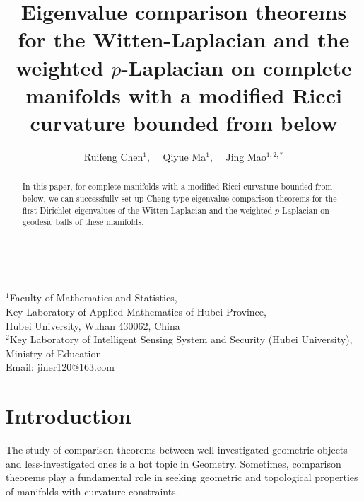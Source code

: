\documentclass[12pt]{article}
\begin{document}
\setcounter{page}{1}
\title{Eigenvalue comparison theorems for the Witten-Laplacian and the weighted $p$-Laplacian on complete manifolds with a modified Ricci
curvature bounded from below}
\author{Ruifeng Chen$^{1}$,~~ Qiyue Ma$^{1}$, ~~Jing Mao$^{1,2,\ast}$}

\date{}
\protect {}
\maketitle ~~~\\[-15mm]



\begin{center}
{\footnotesize $^{1}$Faculty of Mathematics and Statistics,\\
 Key Laboratory of Applied
Mathematics of Hubei Province, \\
Hubei University, Wuhan 430062, China\\
$^{2}$Key Laboratory of Intelligent Sensing System and Security
(Hubei
University), Ministry of Education\\
Email: jiner120@163.com
 }
\end{center}


\begin{abstract}
In this paper, for complete manifolds with a modified Ricci
curvature bounded from below, we can successfully set up Cheng-type
eigenvalue comparison theorems for the first Dirichlet eigenvalues
of the Witten-Laplacian and the weighted $p$-Laplacian on geodesic
balls of these manifolds.
 \end{abstract}




\section{Introduction}
\renewcommand{\thesection}{\arabic{section}}
\renewcommand{\theequation}{\thesection.\arabic{equation}}
\setcounter{equation}{0}

The study of comparison theorems between well-investigated geometric
objects and less-investigated ones is a hot topic in Geometry.
Sometimes, comparison theorems play a fundamental role in seeking
geometric and topological properties of manifolds with curvature
constraints.
\end{document}
